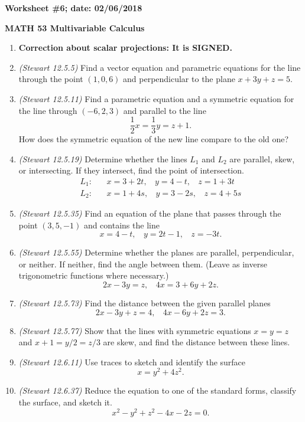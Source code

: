 \documentclass{article}
\begin{document}
{\bf Worksheet \#6; date: 02/06/2018}

{\bf MATH 53 Multivariable Calculus}

\begin{enumerate}
\item {\bf Correction about scalar projections: It is SIGNED.}

\item {\em (Stewart 12.5.5)} Find a vector equation and parametric equations for the line through the point $(1, 0, 6)$ and perpendicular to the plane $x + 3y + z = 5$.

\item {\em (Stewart 12.5.11)} Find a parametric equation and a symmetric equation for the line through $(-6, 2, 3)$ and parallel to the line
\[
\frac{1}{2}x = \frac{1}{3}y = z + 1.
\]
How does the symmetric equation of the new line compare to the old one?

\item {\em (Stewart 12.5.19)} Determine whether the lines $L_1$ and $L_2$ are parallel, skew, or intersecting. If they intersect, find the point of intersection.
\begin{align*}
L_1: & ~~~~ x = 3 + 2t, ~~~~ y = 4 - t, ~~~~ z = 1 + 3t \\
L_2: & ~~~~ x = 1 + 4s, ~~~~ y = 3 - 2s, ~~~~ z = 4 + 5s
\end{align*}

\item {\em (Stewart 12.5.35)} Find an equation of the plane that passes through the point $(3, 5, -1)$ and contains the line
\[
x = 4 - t, ~~~~ y = 2t - 1, ~~~~ z = -3t.
\]

\item {\em (Stewart 12.5.55)} Determine whether the planes are parallel, perpendicular, or neither. If neither, find the angle between them. (Leave as inverse trigonometric functions where necessary.)
\[
2x - 3y = z, ~~~~ 4x = 3 + 6y + 2z.
\]

\item {\em (Stewart 12.5.73)} Find the distance between the given parallel planes
\[
2x - 3y + z = 4, ~~~~ 4x - 6y + 2z = 3.
\]

\item {\em (Stewart 12.5.77)} Show that the lines with symmetric equations $x = y = z$ and $x + 1 = y/2 = z/3$ are skew, and find the distance between these lines.

\item {\em (Stewart 12.6.11)} Use traces to sketch and identify the surface
\[
x = y^2 + 4z^2.
\]

\item {\em (Stewart 12.6.37)} Reduce the equation to one of the standard forms, classify the surface, and sketch it.
\[
x^2 - y^2 + z^2 - 4x - 2z = 0.
\]
\end{enumerate}
\end{document}
